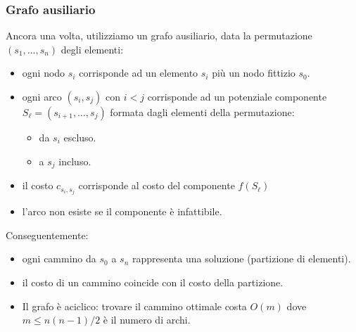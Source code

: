 \documentclass{article}
\begin{document}
\subsubsection{Grafo ausiliario}
Ancora una volta, utilizziamo un grafo ausiliario, data la permutazione $(s_1,\dots,s_n)$
degli elementi:
\begin{itemize}
    \item ogni nodo $s_i$ corrisponde ad un elemento $s_i$ più un nodo fittizio $s_0$.
    \item ogni arco $(s_i,s_j)$ con $i<j$ corrisponde ad un potenziale componente
    $S_\ell=(s_{i+1},\dots,s_j)$ formata dagli elementi della permutazione:
    \begin{itemize}
        \item da $s_i$ escluso.
        \item a $s_j$ incluso.
    \end{itemize}
    \item il costo $c_{s_i,s_j}$ corrisponde al costo del componente $f(S_\ell)$
    \item l'arco non esiste se il componente è infattibile.
\end{itemize}
Conseguentemente:
\begin{itemize}
    \item ogni cammino da $s_0$ a $s_n$ rappresenta una soluzione (partizione di elementi).
    \item il costo di un cammino coincide con il costo della partizione.
    \item Il grafo è aciclico: trovare il cammino ottimale costa $O(m)$ dove
    $m\leq n(n-1)/2$ è il numero di archi.
\end{itemize}
\end{document}
